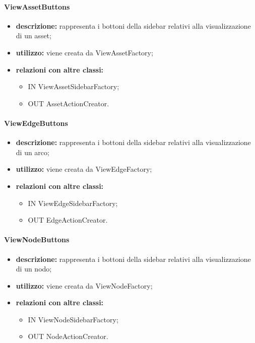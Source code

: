 \paragraph{ViewAssetButtons}
\begin{itemize}
	\item \textbf{descrizione:} rappresenta i bottoni della sidebar relativi alla visualizzazione di un asset;
	\item \textbf{utilizzo:} viene creata da ViewAssetFactory;
	\item \textbf{relazioni con altre classi:} 
	\begin{itemize}
		\item IN ViewAssetSidebarFactory;
		\item OUT AssetActionCreator.
	\end{itemize}
\end{itemize}
\paragraph{ViewEdgeButtons}
\begin{itemize}
	\item \textbf{descrizione:} rappresenta i bottoni della sidebar relativi alla visualizzazione di un arco;
	\item \textbf{utilizzo:} viene creata da ViewEdgeFactory;
	\item \textbf{relazioni con altre classi:} 
	\begin{itemize}
		\item IN ViewEdgeSidebarFactory;
		\item OUT EdgeActionCreator.
	\end{itemize}
\end{itemize}
\paragraph{ViewNodeButtons}
\begin{itemize}
	\item \textbf{descrizione:} rappresenta i bottoni della sidebar relativi alla visualizzazione di un nodo;
	\item \textbf{utilizzo:} viene creata da ViewNodeFactory;
	\item \textbf{relazioni con altre classi:} 
	\begin{itemize}
		\item IN ViewNodeSidebarFactory;
		\item OUT NodeActionCreator.
	\end{itemize}
\end{itemize}
